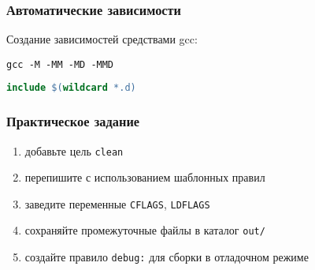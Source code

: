 \begin{frame}[fragile]
	\frametitle{Автоматические зависимости}

	Создание зависимостей средствами gcc:

	\begin{verbatim}
gcc -M -MM -MD -MMD
	\end{verbatim}

	\begin{lstlisting}[language=make]
include $(wildcard *.d)
	\end{lstlisting}
\end{frame}
\begin{frame}[fragile]
	\frametitle{Практическое задание}

	\begin{enumerate}
		\item добавьте цель {\tt clean}
		\item перепишите с использованием шаблонных правил
		\item заведите переменные {\tt CFLAGS}, {\tt LDFLAGS}
		\item сохраняйте промежуточные файлы в каталог {\tt out/}
		\item создайте правило {\tt debug:} для сборки в отладочном режиме
	\end{enumerate}
\end{frame}

